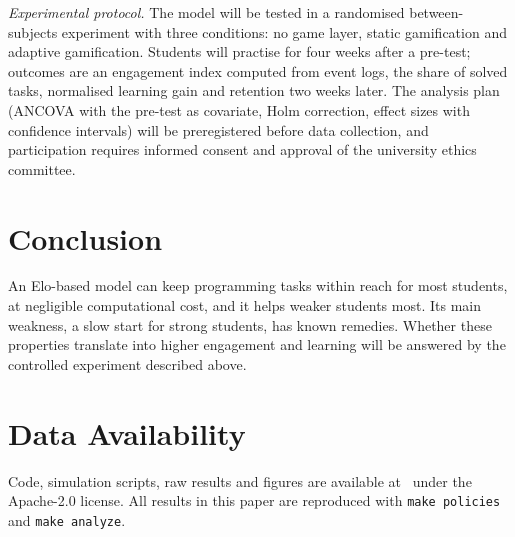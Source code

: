 \documentclass[conference]{IEEEtran}
\begin{document}
\textit{Experimental protocol.} The model will be tested in a randomised between-subjects experiment with three conditions: no game layer, static gamification and adaptive gamification. Students will practise for four weeks after a pre-test; outcomes are an engagement index computed from event logs, the share of solved tasks, normalised learning gain and retention two weeks later. The analysis plan (ANCOVA with the pre-test as covariate, Holm correction, effect sizes with confidence intervals) will be preregistered before data collection, and participation requires informed consent and approval of the university ethics committee.

\section{Conclusion}
An Elo-based model can keep programming tasks within reach for most students, at negligible computational cost, and it helps weaker students most. Its main weakness, a slow start for strong students, has known remedies. Whether these properties translate into higher engagement and learning will be answered by the controlled experiment described above.

\section*{Data Availability}
Code, simulation scripts, raw results and figures are available at~\cite{nirm2026code} under the Apache-2.0 license. All results in this paper are reproduced with \texttt{make policies} and \texttt{make analyze}.



\end{document}
